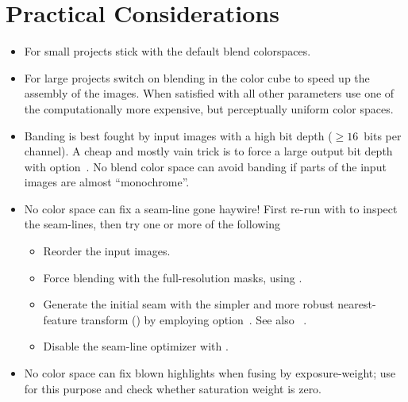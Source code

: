 \section[Practical Considerations]{\label{sec:practical-considerations}%
  Practical Considerations}

\begin{itemize}
\item
  For small projects stick with the default blend colorspaces.

\item
  For large projects switch on blending in the  color cube to speed up the assembly
  of the images.  When satisfied with all other parameters use one of the computationally more
  expensive, but perceptually uniform color spaces.

\item
  Banding is best fought by input images with a high bit depth (\mbox{$\geq 16$ bits} per
  channel).  A cheap and mostly vain trick is to force a large output bit depth with
  option~.  No blend color space can avoid banding if
  parts of the input images are almost ``monochrome''.

\ifenblend
  \item
     No color space can fix a seam-line gone
    haywire!  First re-run  with
     to inspect the seam-lines, then try one
    or more of the following

    \begin{itemize}
    \item
      Reorder the input images.

    \item
      Force blending with the full-resolution masks, using
      .

    \item
      Generate the initial seam with the simpler and more robust nearest-feature transform
      () by employing option~.  See also
      \chapterName~.

    \item
      Disable the seam-line optimizer with .
    \end{itemize}
\fi

\ifenfuse
  \item
     No color space can fix blown highlights when
    fusing by exposure-weight; use
     for this purpose and check
    whether saturation weight is zero.  \fi
\end{itemize}



